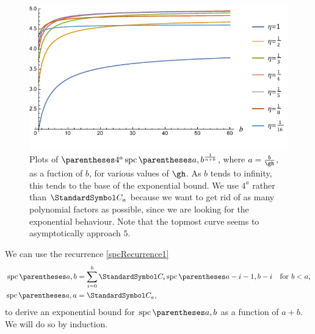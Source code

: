 \begin{figure}[htb!]
\centering
\includegraphics[scale=1]{spc-asymptotics}
\caption{Plots of $\pa{4^{a}\spc\of{a,b}}^{\frac{1}{a+b}}$,
where $a=\frac{b}{\gh}$,
as a fuction of $b$, for various values of $\gh$. As $b$ tends to infinity, this tends to the base
of the exponential bound.
We use $4^a$ rather than $\CatalanNumber a$ because we want to get rid of as many polynomial factors
as possible, since we are looking for the exponential behaviour.
Note that the topmost curve seems to asymptotically approach
$5$.\label{figSpcExperimental}}
\end{figure}

\label{appendixZetaBound}
We can use the recurrence \ref{spcRecurrence1}
\begin{align*}\spc\of{a,b} &= \sum{i=0}[b]
\CatalanNumber {i}
\spc\of{a-i-1,b-i} &\text{for $b<a$,} \\
\spc\of{a,a} &= \CatalanNumber a \text,
\end{align*}
to derive an exponential bound for $\spc\of{a,b}$ as a function of $a+b$.
We will do so by induction.

